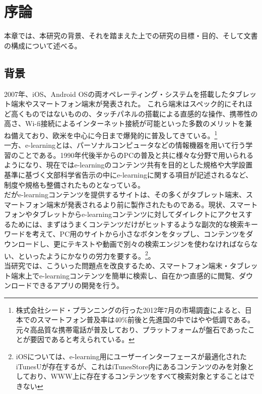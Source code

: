 \chapter{序論}
\label{chap:introduction}

本章では、本研究の背景、それを踏まえた上での研究の目標・目的、そして文書の構成について述べる。

\section{背景}

2007年、iOS、Android OSの両オペレーティング・システムを搭載したタブレット端末やスマートフォン端末が発表された。
これら端末はスペック的にそれほど高くものではないものの、タッチパネルの搭載による直感的な操作、携帯性の高さ、Wi-fi接続によるインターネット接続が可能といった多数のメリットを兼ね備えており、欧米を中心に今日まで爆発的に普及してきている。\footnote{株式会社シード・プランニングの行った2012年7月の市場調査\cite{smartphoneresearch}によると、日本でのスマートフォン普及率は40\%前後と先進国の中ではやや低調である。元々高品質な携帯電話が普及しており、プラットフォームが盤石であったことが要因であると考えられている。}\\
一方、e-learningとは、パーソナルコンピュータなどの情報機器を用いて行う学習のことである。1990年代後半からのPCの普及と共に様々な分野で用いられるようになり、現在ではe-learningのコンテンツ共有を目的とした規格\cite{scorm}や大学設置基準に基づく文部科学省告示の中にe-learningに関する項目が記述される\cite{monkasho}など、制度や規格も整備されたものとなっている。\\
だがe-learningコンテンツを提供するサイトは、その多くがタブレット端末、スマートフォン端末が発表されるより前に製作されたものである。現状、スマートフォンやタブレットからe-learningコンテンツに対してダイレクトにアクセスするためには、まずはうまくコンテンツだけがヒットするような副次的な検索キーワードを考えて、PC用のサイトから小さなボタンをタップし、コンテンツをダウンロードし、更にテキストや動画で別々の検索エンジンを使わなければならない、といったようにかなりの労力を要する。\footnote{iOSについては、e-learning用にユーザーインターフェースが最適化されたiTunesU\cite{itunesu}が存在するが、これはiTunesStore内にあるコンテンツのみを対象としており、WWW上に存在するコンテンツをすべて検索対象とすることはできない}。\\
当研究では、こういった問題点を改良するため、スマートフォン端末・タブレット端末上でe-learningコンテンツを簡単に検索し、自在かつ直感的に閲覧、ダウンロードできるアプリの開発を行う。


